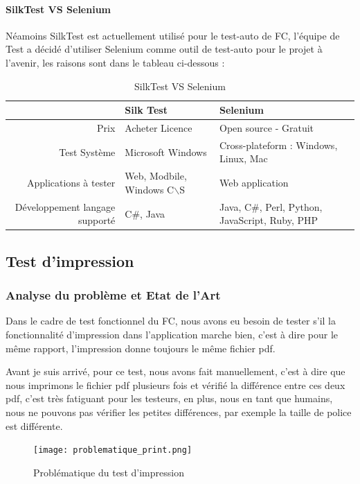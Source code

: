     \paragraph{SilkTest VS Selenium}
    Néamoins SilkTest est actuellement utilisé pour le test-auto de FC, l'équipe de Test a décidé d'utiliser Selenium comme outil de test-auto pour le projet à l'avenir, les raisons sont dans le tableau ci-dessous : 
    \begin{table}[H]
        \centering
        \begin{tabular}{|r|m{5cm}|m{5cm}|}
        \hline
        & \Large{\textbf{Silk Test}} & \Large{\textbf{Selenium}} \\
        \hline
            Prix & Acheter Licence & Open source - Gratuit \\
        \hline
            Test Système & Microsoft Windows & Cross-plateform : Windows, Linux, Mac\\
        \hline 
            Applications à tester & Web, Modbile, Windows C$\backslash$S & Web application\\
        \hline
            Développement langage supporté & C\#, Java & Java, C\#, Perl, Python, JavaScript, Ruby, PHP\\
        \hline
        \end{tabular}
        \caption{SilkTest VS Selenium}
        \label{tab:Silk_vs_Selenium_label}
    \end{table}
\newpage
\subsection{Test d'impression}
    \subsubsection{Analyse du problème et Etat de l'Art}
    Dans le cadre de test fonctionnel du FC, nous avons eu besoin de tester s'il la fonctionnalité d'impression dans l'application marche bien, c'est à dire pour le même rapport, l'impression donne toujours le même fichier pdf.
    
    \par Avant je suis arrivé, pour ce test, nous avons fait manuellement, c'est à dire que nous imprimons le fichier pdf plusieurs fois et vérifié la différence entre ces deux pdf, c'est très fatiguant pour les testeurs, en plus, nous en tant que humains, nous ne pouvons pas vérifier les petites différences, par exemple la taille de police est différente. 
    \begin{figure}[H]
        \centering
        \texttt{[image: problematique\_print.png]}
        \caption{Problématique du test d'impression }
        \label{fig:prolematique_TestPrint_label}
    \end{figure}
    
